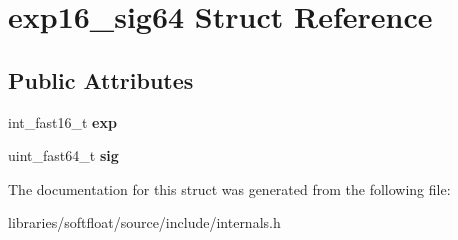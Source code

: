 \hypertarget{structexp16__sig64}{}\section{exp16\+\_\+sig64 Struct Reference}
\label{structexp16__sig64}
\subsection*{Public Attributes}
\begin{DoxyCompactItemize}
\item 
\mbox{\label{structexp16__sig64_a360cf73eb845fb2b8d796db7545df847}} 
int\+\_\+fast16\+\_\+t {\bfseries exp}
\item 
\mbox{\label{structexp16__sig64_a59a60a64a00e660886848ca28885ceb6}} 
uint\+\_\+fast64\+\_\+t {\bfseries sig}
\end{DoxyCompactItemize}


The documentation for this struct was generated from the following file\+:\begin{DoxyCompactItemize}
\item 
libraries/softfloat/source/include/internals.\+h\end{DoxyCompactItemize}
